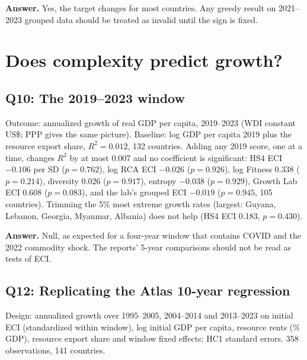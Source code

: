 \documentclass[11pt]{article}
\begin{document}
\textbf{Answer.} Yes, the target changes for most countries. Any greedy result on 2021--2023 grouped data should be treated as invalid until the sign is fixed.

\section{Does complexity predict growth?}

\subsection{Q10: The 2019--2023 window}\label{sec:q10}

Outcome: annualized growth of real GDP per capita, 2019--2023 (WDI constant US\$; PPP gives the same picture). Baseline: log GDP per capita 2019 plus the resource export share, $R^2=0.012$, 132 countries. Adding any 2019 score, one at a time, changes $R^2$ by at most 0.007 and no coefficient is significant: HS4 ECI $-0.106$ per SD ($p=0.762$), log RCA ECI $-0.026$ ($p=0.926$), log Fitness 0.338 ($p=0.214$), diversity 0.026 ($p=0.917$), entropy $-0.038$ ($p=0.929$), Growth Lab ECI 0.608 ($p=0.083$), and the lab's grouped ECI $-0.019$ ($p=0.945$, 105 countries). Trimming the 5\% most extreme growth rates (largest: Guyana, Lebanon, Georgia, Myanmar, Albania) does not help (HS4 ECI 0.183, $p=0.430$).

\textbf{Answer.} Null, as expected for a four-year window that contains COVID and the 2022 commodity shock. The reports' 5-year comparisons should not be read as tests of ECI.

\subsection{Q12: Replicating the Atlas 10-year regression}\label{sec:q12}

Design: annualized growth over 1995--2005, 2004--2014 and 2013--2023 on initial ECI (standardized within window), log initial GDP per capita, resource rents (\% GDP), resource export share and window fixed effects; HC1 standard errors. 358 observations, 141 countries.
\end{document}
